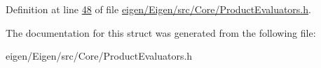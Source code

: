 Definition at line \hyperlink{eigen_2_eigen_2src_2_core_2_product_evaluators_8h_source_l00048}{48} of file \hyperlink{eigen_2_eigen_2src_2_core_2_product_evaluators_8h_source}{eigen/\+Eigen/src/\+Core/\+Product\+Evaluators.\+h}.



The documentation for this struct was generated from the following file\+:\begin{DoxyCompactItemize}
\item 
eigen/\+Eigen/src/\+Core/\+Product\+Evaluators.\+h\end{DoxyCompactItemize}
